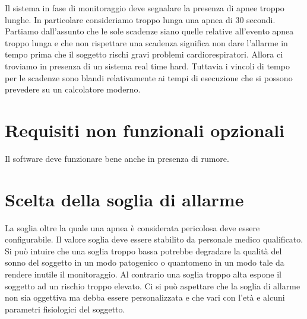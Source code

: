 Il sistema in fase di monitoraggio deve segnalare la presenza di apnee troppo lunghe. In particolare consideriamo troppo lunga una apnea di $30$ secondi. Partiamo dall'assunto che le sole scadenze siano quelle relative all'evento apnea troppo lunga e che non rispettare una scadenza significa non dare l'allarme in tempo prima che il soggetto rischi gravi problemi cardiorespiratori. Allora ci troviamo in presenza di un sistema real time hard. Tuttavia i vincoli di tempo per le scadenze sono blandi relativamente ai tempi di esecuzione che si possono prevedere su un calcolatore moderno.


























\section{Requisiti non funzionali opzionali}
Il software deve funzionare bene anche in presenza di rumore. 



\section{Scelta della soglia di allarme}

La soglia oltre la quale una apnea \`e considerata pericolosa deve essere configurabile.
Il valore soglia deve essere stabilito da personale medico qualificato.
Si pu\`o intuire che una soglia troppo bassa potrebbe degradare la qualit\`a del sonno del soggetto in un modo patogenico o quantomeno in un modo tale da rendere inutile il monitoraggio.
Al contrario una soglia troppo alta espone il soggetto ad un rischio troppo elevato.
Ci si pu\`o aspettare che la soglia di allarme non sia oggettiva ma debba essere personalizzata e che vari con l'et\`a e alcuni parametri fisiologici del soggetto.





